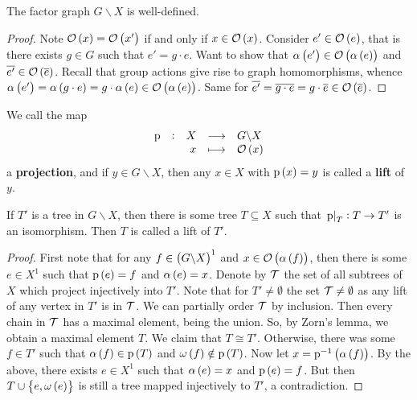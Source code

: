 \begin{lemma}
The factor graph $ G \backslash X $ is well-defined.
\end{lemma}

\begin{proof}
Note $ \OOO\br{x} = \OOO\br{x'} $ if and only if $ x \in \OOO\br{x} $. Consider $ e' \in \OOO\br{e} $, that is there exists $ g \in G $ such that $ e' = g \cdot e $. Want to show that $ \alpha\br{e'} \in \OOO\br{\alpha\br{e}} $ and $ \overline{e'} \in \OOO\br{\overline{e}} $. Recall that group actions give rise to graph homomorphisms, whence $ \alpha\br{e'} = \alpha\br{g \cdot e} = g \cdot \alpha\br{e} \in \OOO\br{\alpha\br{e}} $. Same for $ \overline{e'} = \overline{g \cdot e} = g \cdot \overline{e} \in \OOO\br{\overline{e}} $.
\end{proof}

\begin{definition}
We call the map
$$ \function[\p]{X}{G \backslash X}{x}{\OOO\br{x}} $$
a \textbf{projection}, and if $ y \in G \backslash X $, then any $ x \in X $ with $ \p\br{x} = y $ is called a \textbf{lift} of $ y $.
\end{definition}

\begin{lemma}
If $ T' $ is a tree in $ G \backslash X $, then there is some tree $ T \subseteq X $ such that $ \left. \mathrm{p} \right|_T : T \to T' $ is an isomorphism. Then $ T $ is called a lift of $ T' $.
\end{lemma}

\begin{proof}
First note that for any $ f \in \br{G \backslash X}^1 $ and $ x \in \OOO\br{\alpha\br{f}} $, then there is some $ e \in X^1 $ such that $ \p\br{e} = f $ and $ \alpha\br{e} = x $. Denote by $ \mathcal{T} $ the set of all subtrees of $ X $ which project injectively into $ T' $. Note that for $ T' \ne \emptyset $ the set $ \mathcal{T} \ne \emptyset $ as any lift of any vertex in $ T' $ is in $ \mathcal{T} $. We can partially order $ \mathcal{T} $ by inclusion. Then every chain in $ \mathcal{T} $ has a maximal element, being the union. So, by Zorn's lemma, we obtain a maximal element $ T $. We claim that $ T \cong T' $. Otherwise, there was some $ f \in T' $ such that $ \alpha\br{f} \in \p\br{T} $ and $ \omega\br{f} \notin \p\br{T} $. Now let $ x = \p^{-1}\br{\alpha\br{f}} $. By the above, there exists $ e \in X^1 $ such that $ \alpha\br{e} = x $ and $ \p\br{e} = f $. But then $ T \cup \cbr{e, \omega\br{e}} $ is still a tree mapped injectively to $ T' $, a contradiction.
\end{proof}

